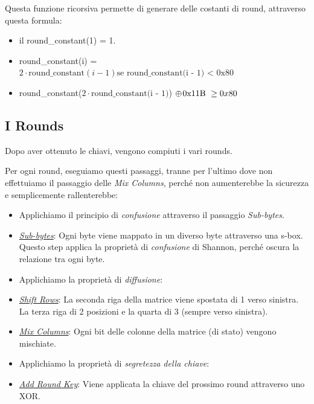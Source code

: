  

\textsf{\small Questa funzione ricorsiva permette di generare delle costanti di round, attraverso questa formula:}

\begin{itemize}
	\item \textsf{\small il round\_constant(1) = 1.}
	\item \textsf{\small round\_constant(i) = $2 \cdot \text{round\_constant}(i - 1) \text{se round\_constant(i - 1) < 0x80}$}
	\item \textsf{\small round\_constant($2 \cdot \text{round\_constant(i - 1)}$) $ \oplus \hspace{0.3mm} \text{0x11B } \ge 0x80$ }
\end{itemize}

\subsection{I Rounds}

 

\textsf{\small Dopo aver ottenuto le chiavi, vengono compiuti i vari rounds.} 

\textsf{\small Per ogni round, eseguiamo questi passaggi, tranne per l'ultimo dove non effettuiamo il passaggio delle \emph{Mix Columns}, perché non aumenterebbe la sicurezza e semplicemente rallenterebbe: } %

       

\begin{itemize}
	\item[] \textsf{\small Applichiamo il principio di \emph{confusione} attraverso il passaggio \emph{Sub-bytes}.}
	\item \textsf{\small \underline{\emph{Sub-bytes}}: Ogni byte viene mappato in un diverso byte attraverso una s-box. Questo step applica la proprietà di \emph{confusione} di Shannon, perché oscura la relazione tra ogni byte.}
	\item[] \textsf{\small Applichiamo la proprietà di \emph{diffusione}:}
	\item \textsf{\small \underline{\emph{Shift Rows}}: La seconda riga della matrice viene spostata di 1 verso sinistra. La terza riga di 2 posizioni e la quarta di 3 (sempre verso sinistra).}
	\item \textsf{\small \underline{\emph{Mix Columns}}: Ogni bit delle colonne della matrice (di stato) vengono mischiate.} %
	\item[] \textsf{\small Applichiamo la proprietà di \emph{segretezza della chiave}:}
	\item \textsf{\small \underline{\emph{Add Round Key}}: Viene applicata la chiave del prossimo round attraverso uno XOR.} %
\end{itemize}

